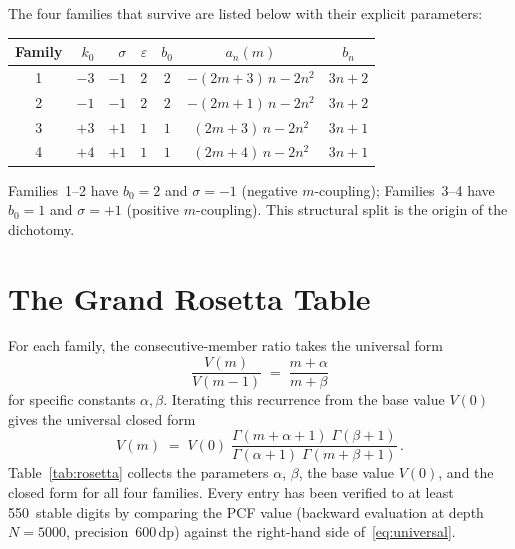 \documentclass[11pt,a4paper]{article}
\theoremstyle{definition}
\theoremstyle{remark}
\begin{document}
The four families that survive are listed below with their
explicit parameters:

\begin{center}
\begin{tabular}{crrrccc}
\toprule
Family & $k_0$ & $\sigma$ & $\varepsilon$ & $b_0$ & $a_n(m)$ & $b_n$ \\
\midrule
1 & $-3$ & $-1$ & $2$ & $2$ & $-(2m{+}3)\,n - 2n^2$ & $3n+2$ \\
2 & $-1$ & $-1$ & $2$ & $2$ & $-(2m{+}1)\,n - 2n^2$ & $3n+2$ \\
3 & $+3$ & $+1$ & $1$ & $1$ & $(2m{+}3)\,n - 2n^2$  & $3n+1$ \\
4 & $+4$ & $+1$ & $1$ & $1$ & $(2m{+}4)\,n - 2n^2$  & $3n+1$ \\
\bottomrule
\end{tabular}
\end{center}

\noindent
Families~1--2 have $b_0 = 2$ and $\sigma = -1$ (negative $m$-coupling);
Families~3--4 have $b_0 = 1$ and $\sigma = +1$ (positive $m$-coupling).
This structural split is the origin of the dichotomy.

\section{The Grand Rosetta Table}\label{sec:table}

For each family, the consecutive-member ratio takes the universal form
\begin{equation}\label{eq:ratio}
  \frac{V(m)}{V(m-1)} \;=\; \frac{m + \alpha}{m + \beta}
\end{equation}
for specific constants $\alpha,\beta$.
Iterating this recurrence from the base value $V(0)$ gives the
universal closed form
\begin{equation}\label{eq:universal}
  V(m) \;=\; V(0)\;\frac{\Gamma(m+\alpha+1)\;\Gamma(\beta+1)}
                         {\Gamma(\alpha+1)\;\Gamma(m+\beta+1)}\,.
\end{equation}
Table~\ref{tab:rosetta} collects the parameters $\alpha$, $\beta$,
the base value $V(0)$, and the closed form for all four families.
Every entry has been verified to at least 550~stable digits by
comparing the PCF value (backward evaluation at depth $N=5000$,
precision~600\,dp) against the right-hand side
of~\eqref{eq:universal}.
\end{document}
